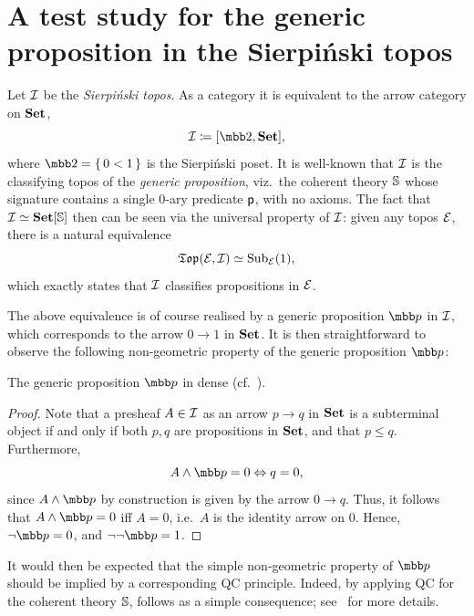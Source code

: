 \section{A test study for the generic proposition in the Sierpi\'nski topos}\label{sec:testcasesierpinski}

Let $\mathcal{I}$ be the \emph{Sierpi\'nski topos}. As a category it is equivalent to the arrow category on $\mathbf{Set}$,
\[ \mc I \coloneq [\mbb 2, \Set], \]
where $\mbb 2 = \set{0 < 1}$ is the Sierpi\'nski poset. It is well-known that $\mathcal{I}$ is the classifying topos of the \emph{generic proposition}, viz.\ the coherent theory $\mathbb{S}$ whose signature contains a single 0-ary predicate $\mathsf{p}$, with no axioms. The fact that $\mathcal{I} \simeq \mathbf{Set}[\mathbb{S}]$ then can be seen via the universal property of $\mathcal{I}$: given any topos $\mathcal{E}$, there is a natural equivalence 
\[ \mathfrak{Top}(\mathcal{E},\mathcal{I}) \simeq \mathrm{Sub}_{\mathcal{E}}(1), \]
which exactly states that $\mathcal{I}$ classifies propositions in $\mathcal{E}$. 

The above equivalence is of course realised by a generic proposition $\mbb p$ in $\mathcal{I}$, which corresponds to the arrow $0 \to 1$ in $\mathbf{Set}$. It is then straightforward to observe the following non-geometric property of the generic proposition $\mbb p$:

\begin{proposition}\label{prop:genericpropnegneg}
  The generic proposition $\mbb p$ in dense (cf.~).
\end{proposition}
\begin{proof}
  Note that a presheaf $A\in\mathcal{I}$ as an arrow $p \to q$ in $\mathbf{Set}$ is a subterminal object if and only if both $p,q$ are propositions in $\mathbf{Set}$, and that $p \le q$. Furthermore,
  \[ A \wedge \mbb p = 0 \eff q = 0, \]
  since $A \wedge \mbb p$ by construction is given by the arrow $0 \to q$. Thus, it follows that $A \wedge \mbb p = 0$ iff $A = 0$, i.e.\ $A$ is the identity arrow on $0$. Hence, $\neg\mbb p = 0$, and $\neg\neg\mbb p = 1$.
\end{proof}

It would then be expected that the simple non-geometric property of $\mbb p$ should be implied by a corresponding \gls{QC} principle. Indeed, by applying \gls{QC} for the coherent theory $\mathbb{S}$,  follows as a simple consequence; see~ for more details.

